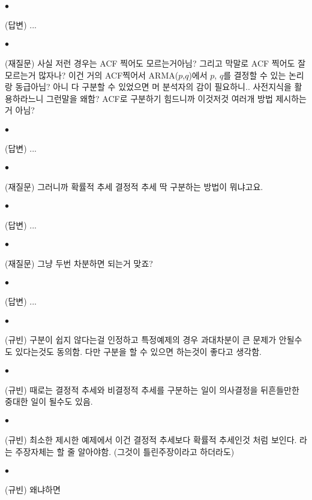 \documentclass[12pt,oneside,english]{book}
\def\ck{\paragraph{\Large$\bullet$}\Large}
\begin{document}
\ck (답변) ... 

\ck (재질문) 사실 저런 경우는 ACF 찍어도 모르는거아님? 그리고 막말로 ACF 찍어도 잘 모르는거 많자나? 이건 거의 ACF찍어서 ARMA($p$,$q$)에서 $p$, $q$를 결정할 수 있는 논리랑 동급아님? 아니 다 구분할 수 있었으면 머 분석자의 감이 필요하니.. 사전지식을 활용하라느니 그런말을 왜함? ACF로 구분하기 힘드니까 이것저것 여러개 방법 제시하는거 아님? 

\ck (답변) ... 

\ck (재질문) 그러니까 확률적 추세 결정적 추세 딱 구분하는 방법이 뭐냐고요. 

\ck (답변) ... 

\ck (재질문) 그냥 두번 차분하면 되는거 맞죠? 

\ck (답변) ... 

\ck (규빈) 구분이 쉽지 않다는걸 인정하고 특정예제의 경우 과대차분이 큰 문제가 안될수도 있다는것도 동의함. 다만 구분을 할 수 있으면 하는것이 좋다고 생각함. 

\ck (규빈) 때로는 결정적 추세와 비결정적 추세를 구분하는 일이 의사결정을 뒤흔들만한 중대한 일이 될수도 있음. 

\ck (규빈) 최소한 제시한 예제에서 이건 결정적 추세보다 확률적 추세인것 처럼 보인다. 라는 주장자체는 할 줄 알아야함. (그것이 틀린주장이라고 하더라도)

\ck (규빈) 왜냐하면 
\end{document}
